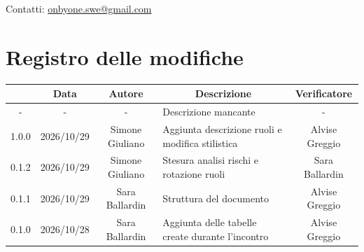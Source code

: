 \documentclass[11pt, a4paper]{article}
\begin{document}
\begin{titlepage}
    \vspace{0.5cm}
    
    {\large Contatti: \href{mailto:onbyone.swe@gmail.com}{onbyone.swe@gmail.com} }
    
\end{titlepage}

\section*{Registro delle modifiche}

\vspace{1cm}
\begin{center}
    \renewcommand{\arraystretch}{1.5}
    \begin{tabularx}{\textwidth}{|c|c|c|X|c|}
        \hline
        \rowcolor{gray!10} 
        \multicolumn{1}{|c|}{\textbf{Versione}} & 
        \multicolumn{1}{c|}{\textbf{Data}} & 
        \multicolumn{1}{c|}{\textbf{Autore}} & 
        \multicolumn{1}{c|}{\textbf{Descrizione}} & 
        \multicolumn{1}{c|}{\textbf{Verificatore}} \\
        \hline
        - & - & - & Descrizione mancante & - \\
        \hline
        1.0.0 & 2026/10/29 & Simone Giuliano & Aggiunta descrizione ruoli e modifica stilistica & Alvise Greggio \\
        \hline
        0.1.2 & 2026/10/29 & Simone Giuliano & Stesura analisi rischi e rotazione ruoli & Sara Ballardin \\
        \hline
        0.1.1 & 2026/10/29 & Sara Ballardin & Struttura del documento & Alvise Greggio \\
        \hline
        0.1.0 & 2026/10/28 & Sara Ballardin & Aggiunta delle tabelle create durante l'incontro & Alvise Greggio \\
        \hline
    \end{tabularx}
\end{center}
\vfill
\newpage

\tableofcontents
\newpage

\end{document}
